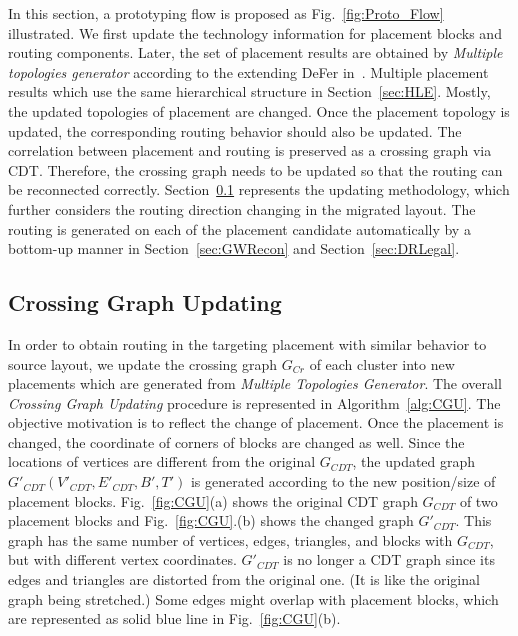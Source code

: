     In this section, a prototyping flow is proposed as Fig.~\ref{fig:Proto_Flow} illustrated. We first update the technology information for placement blocks and routing components. Later, the set of placement results are obtained by \textit{Multiple topologies generator} according to the extending DeFer in~\cite{ALP_YPWeng_iccad2011}. Multiple placement results which use the same hierarchical structure in Section~\ref{sec:HLE}. Mostly, the updated topologies of placement are changed. Once the placement topology is updated, the corresponding routing behavior should also be updated. The correlation between placement and routing is preserved as a crossing graph via CDT. Therefore, the crossing graph needs to be updated so that the routing can be reconnected correctly. Section~\ref{sec:updateG} represents the updating methodology, which further considers the routing direction changing in the migrated layout. The routing is generated on each of the placement candidate automatically by a bottom-up manner in Section~\ref{sec:GWRecon} and Section~\ref{sec:DRLegal}. 

    \subsection{Crossing Graph Updating}\label{sec:updateG}


      In order to obtain routing in the targeting placement with similar behavior to source layout, we update the crossing graph $G_{Cr}$ of each cluster into new placements which are generated from {\it Multiple Topologies Generator}. The overall {\it Crossing Graph Updating} procedure is represented in Algorithm~\ref{alg:CGU}. The objective motivation is to reflect the change of placement. Once the placement is changed, the coordinate of corners of blocks are changed as well. Since the locations of vertices are different from the original $G_{CDT}$, the updated graph $G'_{CDT}(V'_{CDT},E'_{CDT},B',T')$ is generated according to the new position/size of placement blocks. Fig.~\ref{fig:CGU}(a) shows the original CDT graph $G_{CDT}$ of two placement blocks and Fig.~\ref{fig:CGU}.(b) shows the changed graph $G'_{CDT}$. This graph has the same number of vertices, edges, triangles, and blocks with $G_{CDT}$, but with different vertex coordinates. $G'_{CDT}$ is no longer a CDT graph since its edges and triangles are distorted from the original one. (It is like the original graph being stretched.) Some edges might overlap with placement blocks, which are represented as solid blue line in Fig.~\ref{fig:CGU}(b).

